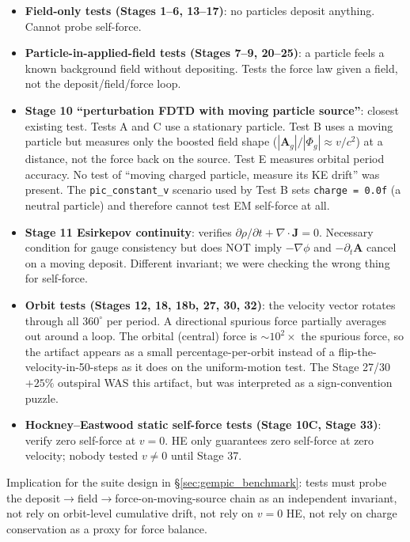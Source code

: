\documentclass[11pt,a4paper]{article}
\newcommand{\vv}[1]{\mathbf{#1}}
\begin{document}
\begin{itemize}
  \item \textbf{Field-only tests (Stages 1--6, 13--17)}: no particles
    deposit anything.  Cannot probe self-force.
  \item \textbf{Particle-in-applied-field tests (Stages 7--9,
    20--25)}: a particle feels a known background field without
    depositing.  Tests the force law given a field, not the
    deposit/field/force loop.
  \item \textbf{Stage 10 ``perturbation FDTD with moving particle
    source''}: closest existing test.  Tests A and C use a stationary
    particle.  Test B uses a moving particle but measures only the
    boosted field shape ($|\vv{A}_g|/|\Phi_g| \approx v/c^2$) at a
    distance, not the force back on the source.  Test E measures
    orbital period accuracy.  No test of ``moving charged particle,
    measure its KE drift'' was present.  The
    \texttt{pic\_constant\_v} scenario used by Test B sets
    \texttt{charge = 0.0f} (a neutral particle) and therefore cannot
    test EM self-force at all.
  \item \textbf{Stage 11 Esirkepov continuity}: verifies
    $\partial\rho/\partial t + \nabla\cdot\vv{J} = 0$.  Necessary
    condition for gauge consistency but does NOT imply $-\nabla\phi$
    and $-\partial_t\vv{A}$ cancel on a moving deposit.  Different
    invariant; we were checking the wrong thing for self-force.
  \item \textbf{Orbit tests (Stages 12, 18, 18b, 27, 30, 32)}: the
    velocity vector rotates through all $360^\circ$ per period.  A
    directional spurious force partially averages out around a loop.
    The orbital (central) force is $\sim 10^2 \times$ the spurious
    force, so the artifact appears as a small percentage-per-orbit
    instead of a flip-the-velocity-in-50-steps as it does on the
    uniform-motion test.  The Stage 27/30 $+25\%$ outspiral WAS this
    artifact, but was interpreted as a sign-convention puzzle.
  \item \textbf{Hockney--Eastwood static self-force tests (Stage 10C,
    Stage 33)}: verify zero self-force at $v=0$.  HE only guarantees
    zero self-force at zero velocity; nobody tested $v \ne 0$ until
    Stage 37.
\end{itemize}

Implication for the suite design in §\ref{sec:gempic_benchmark}:
tests must probe the deposit$\to$field$\to$force-on-moving-source
chain as an independent invariant, not rely on orbit-level cumulative
drift, not rely on $v=0$ HE, not rely on charge conservation as a
proxy for force balance.
\end{document}
